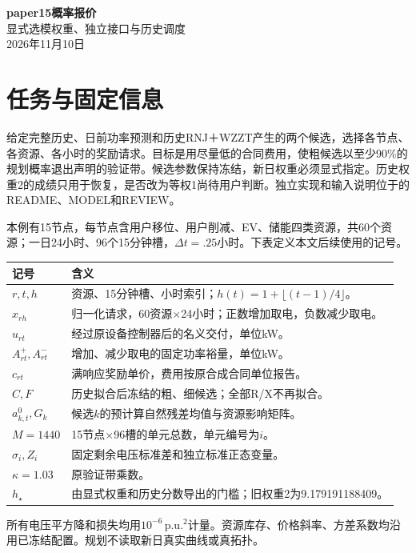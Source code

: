 \documentclass[UTF8,11pt,a4paper,fontset=fandol]{ctexart}
\begin{document}
\begin{center}
{\LARGE\bfseries paper15概率报价}\\[4pt]
{\large 显式选模权重、独立接口与历史调度}\\[3pt]
2026年11月10日
\end{center}

\section{任务与固定信息}
给定完整历史、日前功率预测和历史RNJ＋WZZT产生的两个候选，选择各节点、各资源、各小时的奖励请求。目标是用尽量低的合同费用，使粗候选以至少90\%的规划概率退出声明的验证带。候选参数保持冻结，新日权重必须显式指定。历史权重2的成绩只用于恢复，是否改为等权1尚待用户判断。独立实现和输入说明位于的README、MODEL和REVIEW。

本例有15节点，每节点含用户移位、用户削减、EV、储能四类资源，共60个资源；一日24小时、96个15分钟槽，$\Delta t=.25$小时。下表定义本文后续使用的记号。
\begin{center}\small
\begin{tabularx}{\linewidth}{lX}\toprule
记号&含义\\\midrule
$r,t,h$&资源、15分钟槽、小时索引；$h(t)=1+\lfloor(t-1)/4\rfloor$。\\
$x_{rh}$&归一化请求，60资源$\times$24小时；正数增加取电，负数减少取电。\\
$u_{rt}$&经过原设备控制器后的名义交付，单位kW。\\
$A^+_{rt},A^-_{rt}$&增加、减少取电的固定功率裕量，单位kW。\\
$c_{rt}$&满响应奖励单价，费用按原合成合同单位报告。\\
$C,F$&历史拟合后冻结的粗、细候选；全部R/X不再拟合。\\
$a^0_{k,t},G_k$&候选$k$的预计算自然残差均值与资源影响矩阵。\\
$M=1440$&15节点$\times$96槽的单元总数，单元编号为$i$。\\
$\sigma_i,Z_i$&固定剩余电压标准差和独立标准正态变量。\\
$\kappa=1.03$&原验证带乘数。\\
$h_\star$&由显式权重和历史分数导出的门槛；旧权重2为9.179191188409。\\\bottomrule
\end{tabularx}
\end{center}

所有电压平方降和损失均用$10^{-6}\,\mathrm{p.u.}^2$计量。资源库存、价格斜率、方差系数均沿用已冻结配置。规划不读取新日真实曲线或真拓扑。
\end{document}
